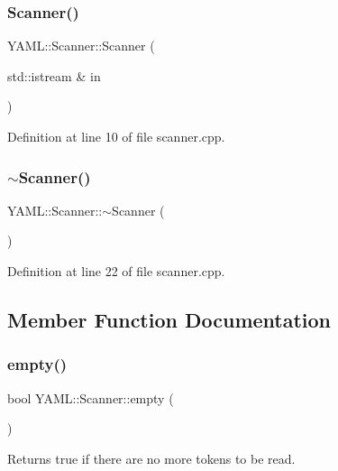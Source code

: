 \subsubsection{\texorpdfstring{Scanner()}{Scanner()}}
{\footnotesize\ttfamily Y\+A\+M\+L\+::\+Scanner\+::\+Scanner (\begin{DoxyParamCaption}\item[{std\+::istream \&}]{in }\end{DoxyParamCaption})\hspace{0.3cm}{\ttfamily [explicit]}}



Definition at line 10 of file scanner.\+cpp.

\mbox{\label{class_y_a_m_l_1_1_scanner_a0ac4b5ac07f864a667f3e742b149a304}} 
\subsubsection{\texorpdfstring{$\sim$Scanner()}{~Scanner()}}
{\footnotesize\ttfamily Y\+A\+M\+L\+::\+Scanner\+::$\sim$\+Scanner (\begin{DoxyParamCaption}{ }\end{DoxyParamCaption})}



Definition at line 22 of file scanner.\+cpp.



\subsection{Member Function Documentation}
\mbox{\label{class_y_a_m_l_1_1_scanner_aca838c1612fbd22188f9d912c90e1129}} 
\subsubsection{\texorpdfstring{empty()}{empty()}}
{\footnotesize\ttfamily bool Y\+A\+M\+L\+::\+Scanner\+::empty (\begin{DoxyParamCaption}{ }\end{DoxyParamCaption})}

Returns true if there are no more tokens to be read. 

